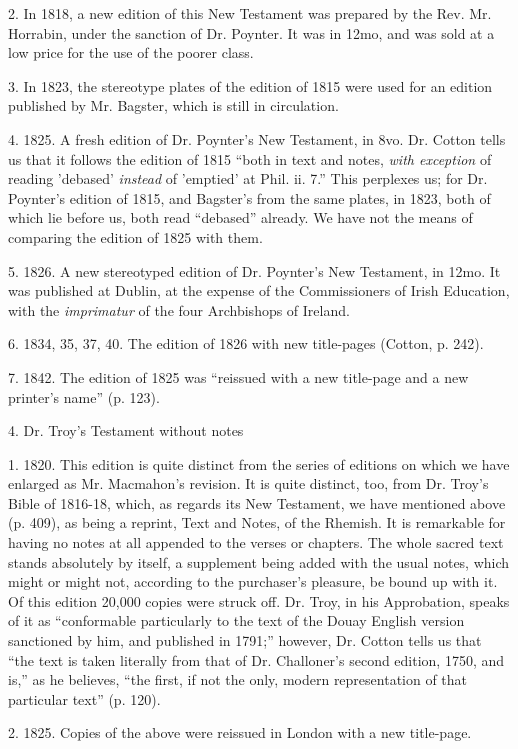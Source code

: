 2. In 1818, a new edition of this New Testament was prepared by the
Rev. Mr. Horrabin, under the sanction of Dr. Poynter. It was in 12mo,
and was sold at a low price for the use of the poorer class.

3. In 1823, the stereotype plates of the edition of 1815 were used
for an edition published by Mr. Bagster, which is still in
circulation.

4. 1825. A fresh edition of Dr. Poynter's New Testament, in 8vo.
Dr. Cotton tells us that it follows the edition of 1815 ``both in
text and notes, \emph{with exception} of reading 'debased' \emph{instead}
of 'emptied' at Phil. ii. 7.'' This perplexes us; for Dr. Poynter's
edition of 1815, and Bagster's from the same plates, in 1823, both of
which lie before us, both read ``debased'' already. We have
not the means of comparing the edition of 1825 with them.

5. 1826. A new stereotyped edition of Dr. Poynter's New Testament,
in 12mo. It was published at Dublin, at the expense of the
Commissioners of Irish Education, with the \emph{imprimatur} of the
four Archbishops of Ireland.

6. 1834, 35, 37, 40. The edition of 1826 with new title-pages
(Cotton, p. 242).

7. 1842. The edition of 1825 was ``reissued with a new
title-page and a new printer's name'' (p. 123).

4. Dr. Troy's Testament without notes

1. 1820. This edition is quite distinct from the series of editions
on which we have enlarged as Mr. Macmahon's revision. It is quite
distinct, too, from Dr. Troy's Bible of 1816-18, which, as regards its
New Testament, we have mentioned above (p. 409), as being a reprint,
Text and Notes, of the Rhemish. It is remarkable for having no notes
at all appended to the verses or chapters. The whole sacred text
stands absolutely by itself, a supplement being added with the usual
notes, which might or might not, according to the purchaser's
pleasure, be bound up with it. Of this edition 20,000 copies were
struck off. Dr. Troy, in his Approbation, speaks of it as
``conformable particularly to the text of the Douay English
version sanctioned by him, and published in 1791;'' however, Dr.
Cotton tells us that ``the text is taken literally from that of
Dr. Challoner's second edition, 1750, and is,'' as he believes,
``the first, if not the only, modern representation of that
particular text'' (p. 120).

2. 1825. Copies of the above were reissued in London with a new
title-page.


